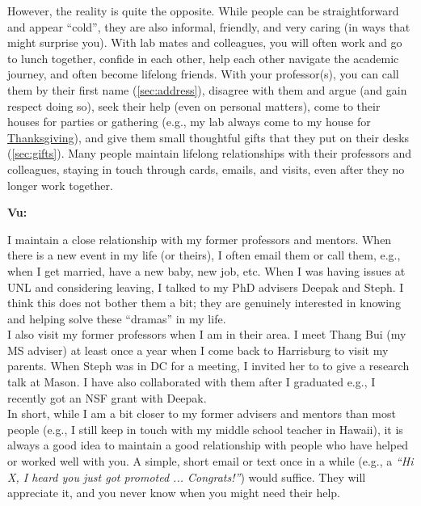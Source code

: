 \documentclass[oneside,11pt,dvipsnames]{book}
\newenvironment{commentbox}[1][]{
  \small
  \begin{mybox}
    {\small \textbf{#1}}
  }{
  \end{mybox}
}
\begin{document}
However, the reality is quite the opposite. While people can be straightforward and appear ``cold'', they are also informal, friendly, and very caring (in ways that might surprise you).
With lab mates and colleagues, you will often work and go to lunch together, confide in each other, help each other navigate the academic journey, and often become lifelong friends.
With your professor(s), you can call them by their first name (\autoref{sec:address}), disagree with them and argue (and gain respect doing so), seek their help (even on personal matters), come to their houses for parties or gathering (e.g., my lab always come to my house for \href{https://photos.app.goo.gl/LFtbqQUuznq9eiL7A}{Thanksgiving}), and give them small thoughtful gifts that they put on their desks (\autoref{sec:gifts}).  
Many people maintain lifelong relationships with their professors and colleagues, staying in touch through cards, emails, and visits, even after they no longer work together.

\begin{commentbox}[Vu:]
    I maintain a close relationship with my former professors and mentors. When there is a new event in my life (or theirs), I often email them or call them, e.g., when I get married, have a new baby, new job, etc. When I was having issues at UNL and considering leaving, I talked to my PhD advisers Deepak and Steph. I think this does not bother them a bit; they are genuinely interested in knowing and helping solve these ``dramas'' in my life.
    \\
    
    I also visit my former professors when I am in their area. I meet Thang Bui (my MS adviser) at least once a year when I come back to Harrisburg to visit my parents. When Steph was in DC for a meeting, I invited her to to give a research talk at Mason. I have also collaborated with them after I graduated e.g., I recently got an NSF grant with Deepak.
    \\
    
    In short, while I am a bit closer to my former advisers and mentors than most people (e.g., I still keep in touch with my middle school teacher in Hawaii), it is always a good idea to maintain a good relationship with people who have helped or worked well with you. A simple, short email or text once in a while (e.g., a \emph{``Hi X, I heard you just got promoted ... Congrats!''}) would suffice. They will appreciate it, and you never know when you might need their help.
    
        
  \end{commentbox}
  
\end{document}
